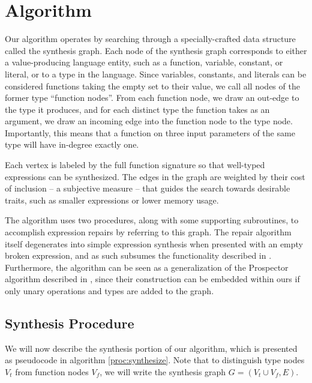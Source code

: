 \section{Algorithm}
\label{sec:algorithm}

Our algorithm operates by searching through a specially-crafted data structure called the synthesis graph. Each node of the synthesis graph corresponds to either a value-producing language entity, such as a function, variable, constant, or literal, or to a type in the language. Since variables, constants, and literals can be considered functions taking the empty set to their value, we call all nodes of the former type ``function nodes''. From each function node, we draw an out-edge to the type it produces, and for each distinct type the function takes as an argument, we draw an incoming edge into the function node to the type node. Importantly, this means that a function on three input parameters of the same type will have in-degree exactly one.

Each vertex is labeled by the full function signature so that well-typed expressions can be synthesized. The edges in the graph are weighted by their cost of inclusion -- a subjective measure -- that guides the search towards desirable traits, such as smaller expressions or lower memory usage.

The algorithm uses two procedures, along with some supporting subroutines, to accomplish expression repairs by referring to this graph. The repair algorithm itself degenerates into simple expression synthesis when presented with an empty broken expression, and as such subsumes the functionality described in \cite{GveroETAL13CompleteCompletionTypesWeights}. Furthermore, the algorithm can be seen as a generalization of the Prospector algorithm described in \cite{MandelinetALL2005Jungloid}, since their construction can be embedded within ours if only unary operations and types are added to the graph.

\subsection{Synthesis Procedure}
We will now describe the synthesis portion of our algorithm, which is presented as pseudocode in algorithm \ref{proc:synthesize}. Note that to distinguish type nodes $V_t$ from function nodes $V_f$, we will write the synthesis graph $G=(V_t \cup V_f, E)$.

